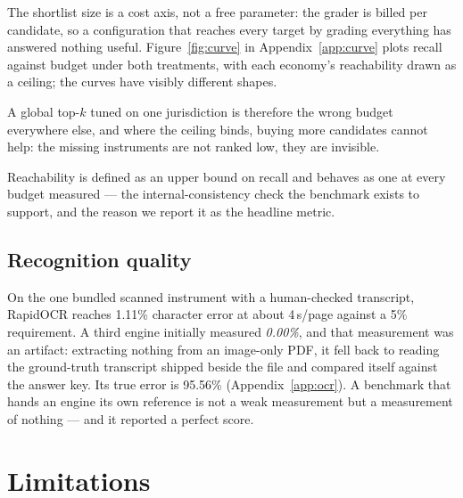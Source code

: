 \documentclass{article}
\begin{document}
The shortlist size is a cost axis, not a free parameter: the grader is billed per
candidate, so a configuration that reaches every target by grading everything has
answered nothing useful. Figure~\ref{fig:curve} in Appendix~\ref{app:curve} plots recall against budget
under both treatments, with each economy's reachability drawn as a ceiling; the
curves have visibly different shapes.




A global top-$k$ tuned on one jurisdiction is therefore the wrong budget
everywhere else, and where the ceiling binds, buying more candidates cannot help:
the missing instruments are not ranked low, they are invisible.


Reachability is defined as an upper bound on recall and behaves as one at every
budget measured --- the internal-consistency check the benchmark exists to
support, and the reason we report it as the headline metric.

\subsection{Recognition quality}

On the one bundled scanned instrument with a human-checked transcript, RapidOCR
reaches 1.11\% character error at about 4\,s/page against a 5\% requirement. A
third engine initially measured \emph{0.00\%}, and that measurement was an
artifact: extracting nothing from an image-only PDF, it fell back to reading the
ground-truth transcript shipped beside the file and compared itself against the
answer key. Its true error is 95.56\% (Appendix~\ref{app:ocr}). A benchmark that
hands an engine its own reference is not a weak measurement but a measurement of
nothing --- and it reported a perfect score.

\section{Limitations}
\end{document}
